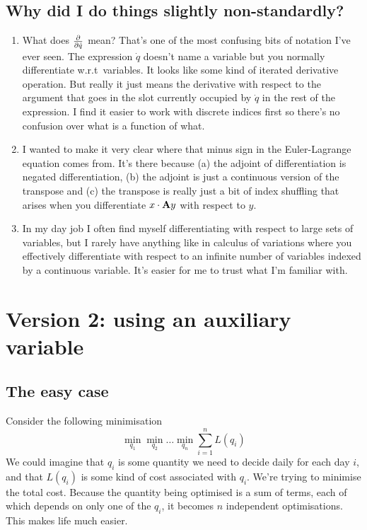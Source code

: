 \documentclass{article}
\begin{document}
\subsection{Why did I do things slightly non-standardly?}
\begin{enumerate}
\item What does $\frac{\partial}{\partial \dot{q}}$ mean? That's one of the most confusing bits of notation I've ever seen. The expression $\dot{q}$ doesn't name a variable but you normally differentiate w.r.t\ variables.
It looks like some kind of iterated derivative operation.
But really it just means the derivative with respect to the argument that goes in the slot currently occupied by $\dot{q}$ in the rest of the expression.
I find it easier to work with discrete indices first so there's no confusion over what is a function of what. 
\item I wanted to make it very clear where that minus sign in the Euler-Lagrange equation comes from. It's there because (a) the adjoint of differentiation is negated differentiation, (b) the adjoint is just a continuous version of the transpose and (c) the transpose is really just a bit of index shuffling that arises when you differentiate $x\cdot\mathbf{A} y$ with respect to $y$.
\item In my day job I often find myself differentiating with respect to large sets of variables, but I rarely have anything like in calculus of variations where you effectively differentiate with respect to an infinite number of variables indexed by a continuous variable.
It's easier for me to trust what I'm familiar with.
\end{enumerate}

\section{Version 2: using an auxiliary variable}
\subsection{The easy case}

Consider the following minimisation
\begin{equation}
\min_{q_1}\min_{q_2}\ldots\min_{q_n}\sum_{i=1}^nL(q_i)
\label{simplified}
\end{equation}
We could imagine that $q_i$ is some quantity we need to decide daily for each day $i$, and that $L(q_i)$ is some kind of cost associated with $q_i$.
We're trying to minimise the total cost.
Because the quantity being optimised is a sum of terms, each of which depends on only one of the $q_i$, it becomes $n$ independent optimisations.
This makes life much easier.
\end{document}
